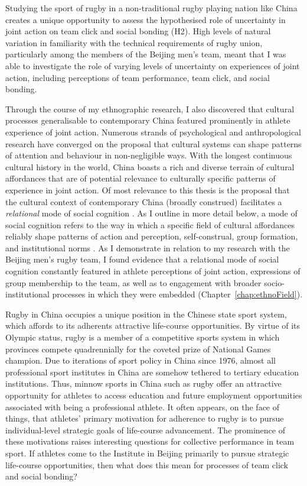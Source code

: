 \begin{CJK}{UTF8}{gbsn}
Studying the sport of rugby in a non-traditional rugby playing nation like China creates a unique opportunity to assess the hypothesised role of uncertainty in joint action on team click and social bonding (H2). High levels of natural variation in familiarity with the technical requirements of rugby union, particularly among the members of the Beijing men's team, meant that I was able to investigate the role of varying levels of uncertainty on experiences of joint action, including perceptions of team performance, team click, and social bonding.

Through the course of my ethnographic research, I also discovered that cultural processes generalisable to contemporary China featured prominently in athlete experience of joint action.  Numerous strands of psychological and anthropological research have converged on the proposal that cultural systems can shape patterns of attention and behaviour in non-negligible ways.  With the longest continuous cultural history in the world, China boasts a rich and diverse terrain of cultural affordances that are of potential relevance to culturally specific patterns of experience in joint action.  Of most relevance to this thesis is the proposal that the cultural context of contemporary China (broadly construed) facilitates a \textit{relational} mode of social cognition \citep{Nisbett2003,Yuki2005}.  As I outline in more detail below, a mode of social cognition refers to the way in which a specific field of cultural affordances reliably shape patterns of action and perception, self-construal, group formation, and institutional norms \citep{Nisbett2003a}.  As I demonstrate in relation to my research with the Beijing men’s rugby team, I found evidence that a relational mode of social cognition constantly featured in athlete perceptions of joint action, expressions of group membership to the team, as well as to engagement with broader socio-institutional processes in which they were embedded (Chapter~\ref{chap:ethnoField}).

Rugby in China occupies a unique position in the Chinese state sport system, which affords to its adherents attractive life-course opportunities.  By virtue of its Olympic status, rugby is a member of a competitive sports system in which provinces compete quadrennially for the coveted prize of National Games champion.  Due to iterations of sport policy in China since 1976, almost all professional sport institutes in China are somehow tethered to tertiary education institutions.   Thus, minnow sports in China such as rugby offer an attractive opportunity for athletes to access education and future employment opportunities associated with being a professional athlete.   It often appears, on the face of things, that athletes’ primary motivation for adherence to rugby is to pursue individual-level strategic goals of life-course advancement.  The prominence of these motivations raises interesting questions for collective performance in team sport.  If athletes come to the Institute in Beijing primarily to pursue strategic life-course opportunities, then what does this mean for processes of team click and social bonding?


\end{CJK}
